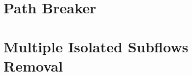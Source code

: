 

\section{Path Breaker}\label{section:PathBreaker}



\section{Multiple Isolated Subflows Removal}\label{section:MultipleIsolatedSubflowsRemoval}


